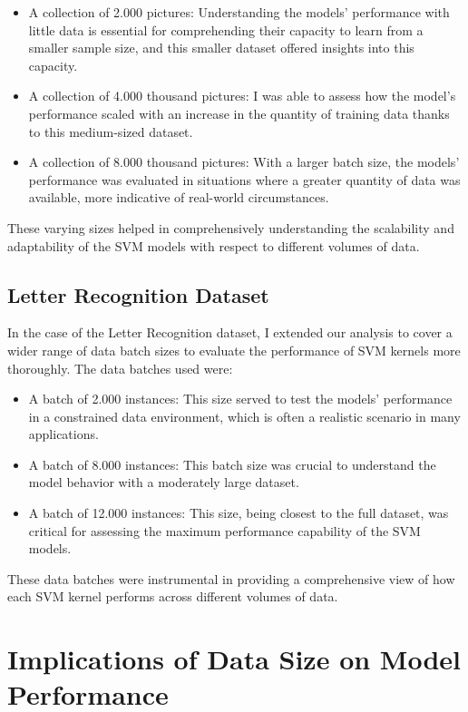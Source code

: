 \documentclass[conference]{IEEEtran}
\begin{document}
\begin{itemize}
\item A collection of 2.000 pictures: Understanding the models' performance with little data is essential for comprehending their capacity to learn from a smaller sample size, and this smaller dataset offered insights into this capacity.
\item A collection of 4.000 thousand pictures: I was able to assess how the model's performance scaled with an increase in the quantity of training data thanks to this medium-sized dataset.
\item A collection of 8.000 thousand pictures: With a larger batch size, the models' performance was evaluated in situations where a greater quantity of data was available, more indicative of real-world circumstances.
\end{itemize}

These varying sizes helped in comprehensively understanding the scalability and adaptability of the SVM models with respect to different volumes of data.

\subsection{Letter Recognition Dataset}

In the case of the Letter Recognition dataset, I extended our analysis to cover a wider range of data batch sizes to evaluate the performance of SVM kernels more thoroughly. The data batches used were:

\begin{itemize}
\item A batch of 2.000 instances: This size served to test the models' performance in a constrained data environment, which is often a realistic scenario in many applications.
\item A batch of 8.000 instances: This batch size was crucial to understand the model behavior with a moderately large dataset.
\item A batch of 12.000 instances: This size, being closest to the full dataset, was critical for assessing the maximum performance capability of the SVM models.
\end{itemize}

These data batches were instrumental in providing a comprehensive view of how each SVM kernel performs across different volumes of data.

\section{Implications of Data Size on Model Performance}
\end{document}
